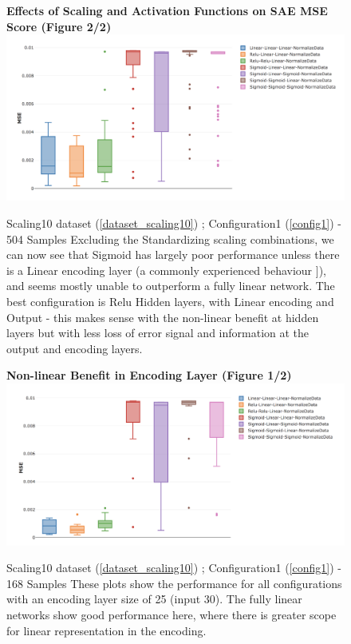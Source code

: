\documentclass[a4paper,11pt,oneside]{article}
\theoremstyle{plain}
\theoremstyle{definition}
\begin{document}
\begin{figure}[H]
		\centering 
		\textbf{Effects of Scaling and Activation Functions on SAE MSE Score (Figure 2/2)}
		\includegraphics[scale=0.4]{images/results/linearity/1Activation_Combos-Min_MSE.png}
		\caption{Scaling10 dataset (\ref{dataset_scaling10}) ; Configuration1 (\ref{config1}) - 504 Samples
			\newline \newline Excluding the Standardizing scaling combinations, we can now see that Sigmoid has largely poor performance unless there is a Linear encoding layer (a commonly experienced behaviour \cite{Hinton2}]), and seems mostly unable to outperform a fully linear network. The best configuration is Relu Hidden layers, with Linear encoding and Output - this makes sense with the non-linear benefit at hidden layers but with less loss of error signal and information at the output and encoding layers.}
		\label{figure-results-linear-act}
\end{figure}

\begin{figure}[H]
		\centering 
		\textbf{Non-linear Benefit in Encoding Layer (Figure 1/2)}
		\includegraphics[scale=0.4]{images/results/linearity/3Encoding_25_Activation_Combos_Min_MSE.png}
		\caption{Scaling10 dataset (\ref{dataset_scaling10}) ; Configuration1 (\ref{config1}) - 168 Samples
			\newline \newline These plots show the performance for all configurations with an encoding layer size of 25 (input 30). The fully linear networks show good performance here, where there is greater scope for linear representation in the encoding.}
		\label{figure-results-encoding25}
\end{figure}
\end{document}

